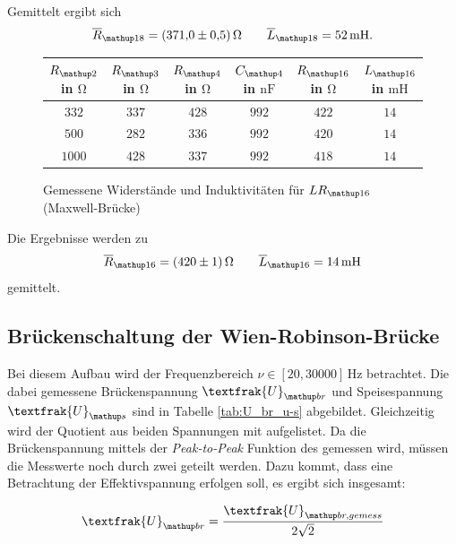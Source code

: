 Gemittelt ergibt sich
\begin{equation}
\label{eq:wert_lr_18_max}
\overline{R}_{\map{18}}=\SI{371\pm0.5}{\ohm} \qquad \overline{L}_{\map{18}}=\SI{52}{\milli\henry}.
\end{equation}


\begin{figure}
\centering
\caption{Gemessene Widerstände und Induktivitäten für $LR\ua{16}$ (Maxwell-Brücke)}
  \label{tab:lc_16}
\begin{tabular}{S S S S S S }
    \toprule
    {$R\ua{2}$  in $\si{\ohm}$} &  {$R\ua{3}$ in $\si{\ohm}$} & {$R\ua{4}$ in $\si{\ohm}$} & {$C\ua{4}$ in $\si{\nano\farad}$}& {$R\ua{16}$ in $\si{\ohm}$} &  {$L\ua{16}$ in $\si{\milli\henry}$} \\
    \midrule
     {$\num{332}$} & {$\num{337}$} &  {$\num{428}$}& {$\num{992}$}  &  {$\num{422}$} & {$\num{14}$}\\
     {$\num{500}$} & {$\num{282}$}  & {$\num{336}$} & {$\num{992}$} & {$\num{420}$} & {$\num{14}$}\\
     {$\num{1000}$} & {$\num{428}$}  & {$\num{337}$} & {$\num{992}$} &{$\num{418}$} & {$\num{14}$}  \\
    \bottomrule
  \end{tabular}
 \end{figure}


Die Ergebnisse werden zu %
\begin{equation}
\label{eq:wert_lr_16_max}
\overline{R}_{\map{16}}=\SI{420\pm1}{\ohm} \qquad \overline{L}_{\map{16}}=\SI{14}{\milli\henry}
\end{equation}
gemittelt.

\subsection{Brückenschaltung der Wien-Robinson-Brücke}

Bei diesem Aufbau wird der Frequenzbereich $\nu\in\left[20,30000\right]\,\si{\hertz}$ betrachtet.
Die dabei gemessene Brückenspannung $\textfrak{U}\ua{br}$ und Speisespannung $\textfrak{U}\ua{s}$ sind in Tabelle \ref{tab:U_br_u-s} abgebildet.
Gleichzeitig wird der Quotient aus beiden Spannungen mit aufgelistet.
Da die Brückenspannung mittels der \emph{Peak-to-Peak} Funktion des gemessen wird,
müssen die Messwerte noch durch zwei geteilt werden. Dazu kommt, dass eine Betrachtung der Effektivspannung erfolgen soll, es ergibt sich insgesamt:


\begin{equation*}
\textfrak{U}\ua{br}=\frac{\textfrak{U}\ua{br,gemess}}{2\sqrt{2}}
\end{equation*}



